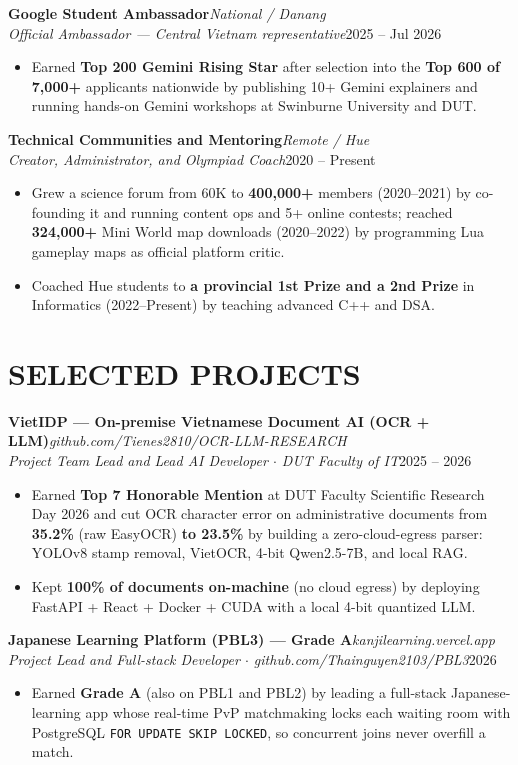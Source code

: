 \documentclass[10pt,a4paper]{article}
\newcommand{\role}[4]{%
  {\bfseries\color{ink}#1}\hfill{\itshape\color{muted}\small #2}\\[-0.6pt]
  {\itshape\small\color{ink}#3}\hfill{\small\color{muted}#4}\par\vspace{0.4pt}%
}
\begin{document}
\role{Google Student Ambassador}{National / Danang}
{Official Ambassador --- Central Vietnam representative}{2025 -- Jul 2026}
\begin{itemize}
  \item \small Earned \textbf{Top 200 Gemini Rising Star} after selection into the \textbf{Top 600 of 7{,}000+} applicants nationwide by publishing 10+ Gemini explainers and running hands-on Gemini workshops at Swinburne University and DUT.
\end{itemize}

\role{Technical Communities and Mentoring}{Remote / Hue}
{Creator, Administrator, and Olympiad Coach}{2020 -- Present}
\begin{itemize}
  \item \small Grew a science forum from 60K to \textbf{400{,}000+} members (2020--2021) by co-founding it and running content ops and 5+ online contests; reached \textbf{324{,}000+} Mini World map downloads (2020--2022) by programming Lua gameplay maps as official platform critic.
  \item \small Coached Hue students to \textbf{a provincial 1st Prize and a 2nd Prize} in Informatics (2022--Present) by teaching advanced C++ and DSA.
\end{itemize}

\section{SELECTED PROJECTS}
\role{VietIDP --- On-premise Vietnamese Document AI (OCR + LLM)}{github.com/Tienes2810/OCR-LLM-RESEARCH}
{Project Team Lead and Lead AI Developer $\cdot$ DUT Faculty of IT}{2025 -- 2026}
\begin{itemize}
  \item \small Earned \textbf{Top 7 Honorable Mention} at DUT Faculty Scientific Research Day 2026 and cut OCR character error on administrative documents from \textbf{35.2\%} (raw EasyOCR) \textbf{to 23.5\%} by building a zero-cloud-egress parser: YOLOv8 stamp removal, VietOCR, 4-bit Qwen2.5-7B, and local RAG.
  \item \small Kept \textbf{100\% of documents on-machine} (no cloud egress) by deploying FastAPI + React + Docker + CUDA with a local 4-bit quantized LLM.
\end{itemize}

\role{Japanese Learning Platform (PBL3) --- Grade A}{kanjilearning.vercel.app}
{Project Lead and Full-stack Developer $\cdot$ github.com/Thainguyen2103/PBL3}{2026}
\begin{itemize}
  \item \small Earned \textbf{Grade A} (also on PBL1 and PBL2) by leading a full-stack Japanese-learning app whose real-time PvP matchmaking locks each waiting room with PostgreSQL \texttt{FOR UPDATE SKIP LOCKED}, so concurrent joins never overfill a match.
\end{itemize}
\end{document}
